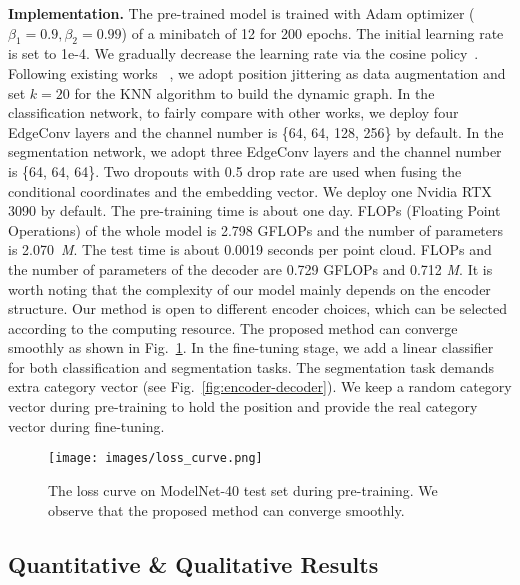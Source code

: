 \documentclass[journal]{IEEEtran}
\begin{document}
\textbf{Implementation.} The pre-trained model is trained with Adam optimizer ($\beta_1=0.9, \beta_2 = 0.99$) of a minibatch of 12 for 200 epochs. The initial learning rate is set to 1e-4. We gradually decrease the learning rate via the cosine policy~\cite{2016SGDR}. Following existing works ~\cite{wang2019dynamic, zheng2020parameter}, we adopt position jittering as data augmentation and set $k=20$ for the KNN algorithm to build the dynamic graph. 
In the classification network, to fairly compare with other works, we deploy four EdgeConv layers and the channel number is \{64, 64, 128, 256\} by default. In the segmentation network, we adopt three EdgeConv layers and the channel number is \{64, 64, 64\}. Two dropouts with 0.5 drop rate are used when fusing the conditional coordinates and the embedding vector. We deploy one Nvidia RTX 3090 by default. The pre-training time is about one day. FLOPs (Floating Point Operations) of the whole model is 2.798 GFLOPs and the number of parameters is 2.070~\emph{M}. The test time is about 0.0019 seconds per point cloud. FLOPs and the number of parameters of the decoder are 0.729 GFLOPs and 0.712 \emph{M}. It is worth noting that the complexity of our model mainly depends on the encoder structure. Our method is open to different encoder choices, which can be selected according to the computing resource. 
The proposed method can converge smoothly as shown in Fig.~\ref{fig:loss_curve}. In the fine-tuning stage, we add a linear classifier for both classification and segmentation tasks. The segmentation task demands extra category vector (see Fig.~\ref{fig:encoder-decoder}). We keep a random category vector during pre-training to hold the position and provide the real category vector during fine-tuning.



\begin{figure}[t]
\begin{center}
\texttt{[image: images/loss\_curve.png]}
\end{center}
\vspace{-.15in}
   \caption{The loss curve on ModelNet-40 test set during pre-training. We observe that the proposed method can converge smoothly.}
\label{fig:loss_curve}
\end{figure}




\subsection{Quantitative \& Qualitative Results}
\end{document}
